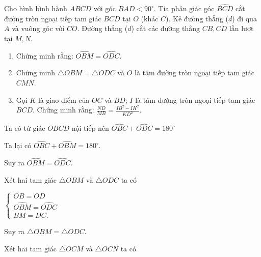 \begin{ex}%
    Cho hình bình hành $ABCD$ với góc $\widehat{BAD} < 90^{\circ}$. Tia phân giác góc $\widehat{BCD}$ cắt đường tròn ngoại tiếp tam giác $BCD$ tại $O$ (khác $C$). Kẻ đường thẳng ($d$) đi qua $A$ và vuông góc với $CO$. Đường thẳng ($d$) cắt các đường thẳng $CB,CD$ lần lượt tại $M,N$.
    \begin{enumerate}
        \item Chứng minh rằng: $\widehat{OBM}=\widehat{ODC}$.
        \item Chứng minh $\triangle OBM=\triangle ODC$ và $O$ là tâm đường tròn ngoại tiếp tam giác $CMN$.
        \item Gọi $K$ là giao điểm của $OC$ và $BD$; $I$ là tâm đường tròn ngoại tiếp tam giác $BCD$. Chứng minh rằng: $\displaystyle \frac{ND}{MB}= \frac{IB^2-IK^2}{KD^2}$.
    \end{enumerate}
\loigiai
    {
    \begin{enumerate}
    	\immini
    	{
    	\item Ta có tứ giác $OBCD$ nội tiếp nên $\widehat{OBC}+ \widehat{ODC} =180^\circ$
    	
    	Ta lại có $\widehat{OBC}+ \widehat{OBM}=180^\circ$.
    	
    	Suy ra $\widehat{OBM}=\widehat{ODC}$.  
    	
    	\item Xét hai tam giác $\triangle OBM$ và $\triangle ODC$ ta có
    	
    	$\begin{cases}
    	OB=OD\\
    	\widehat{OBM}= \widehat{ODC} \\   		
    	BM=DC.
    	\end{cases}$
    	
    	Suy ra $\triangle OBM= \triangle ODC$.
    	
    	Xét hai tam giác $\triangle OCM$ và $\triangle OCN$ ta có
    	
}
\end{enumerate}}
\end{ex}
